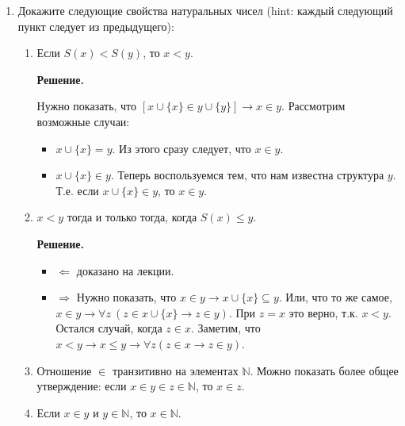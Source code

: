 \begin{enumerate}
\item Докажите следующие свойства натуральных чисел (hint: каждый следующий пункт следует из предыдущего):
\begin{enumerate}
\item Если $S(x) < S(y)$, то $x < y$.

\textbf{Решение.}

Нужно показать, что $\left[x \cup \{x\} \in y \cup \{y\}\right] \to x \in y$. Рассмотрим возможные случаи:
\begin{itemize}
	\item $x \cup \{x\} = y$. Из этого сразу следует, что $x \in y$.
	\item $x \cup \{x\} \in y$. Теперь воспользуемся тем, что нам известна структура $y$. Т.е. если $x \cup \{x\} 
	\in	y$, то $x \in y$.
\end{itemize}
\item $x < y$ тогда и только тогда, когда $S(x) \leq y$.

\textbf{Решение.}
\begin{itemize}
	\item $\Leftarrow$ доказано на лекции.
	\item $\Rightarrow$ Нужно показать, что $x \in y \to x \cup \{x\} \subseteq y$. Или, что то же самое, $x \in 
	y \to \forall z \ (z \in x \cup \{x\} \to z \in y)$. При $z = x$ это верно, т.к. $x < y$. Остался случай, 
	когда $z \in x$. Заметим, что $x < y \to x \leq y \to \forall z (z \in x \to z \in y)$.
\end{itemize}

\item Отношение $\in$ транзитивно на элементах $\mathbb{N}$.
    Можно показать более общее утверждение: если $x \in y \in z \in \mathbb{N}$, то $x \in z$.
\item Если $x \in y$ и $y \in \mathbb{N}$, то $x \in \mathbb{N}$.
\end{enumerate}

\end{enumerate}
